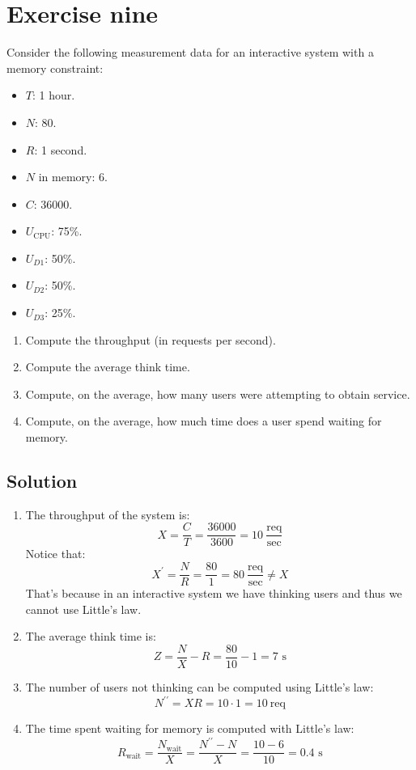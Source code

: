 \section{Exercise nine}

Consider the following measurement data for an interactive system with a memory constraint:
\begin{itemize}
    \item $T$: 1 hour.
    \item $N$: 80.
    \item $R$: 1 second.
    \item $N$ in memory: 6.
    \item $C$: 36000.
    \item $U_{\text{CPU}}$: 75\%.
    \item $U_{D1}$: 50\%.
    \item $U_{D2}$: 50\%.
    \item $U_{D3}$: 25\%.
\end{itemize}
\begin{enumerate}
    \item Compute the throughput (in requests per second).
    \item Compute the average think time.
    \item Compute, on the average, how many users were attempting to obtain service. 
    \item Compute, on the average, how much time does a user spend waiting for memory. 
\end{enumerate}

\subsection*{Solution}
\begin{enumerate}
    \item The throughput of the system is:
        \[X=\dfrac{C}{T}=\dfrac{36000}{3600}=10\:\dfrac{\text{req}}{\text{sec}}\]
        Notice that:
        \[X^\prime=\dfrac{N}{R}=\dfrac{80}{1}=80\:\dfrac{\text{req}}{\text{sec}}\neq X\]
        That's because in an interactive system we have thinking users and thus we cannot use Little's law.
    \item The average think time is:
        \[Z=\dfrac{N}{X}-R=\dfrac{80}{10}-1=7\text{ s}\]
    \item The number of users not thinking can be computed using Little's law:
        \[N^{\prime\prime}=XR=10\cdot 1=10\:\text{req}\]
    \item The time spent waiting for memory is computed with Little's law:
        \[R_{\text{wait}}=\dfrac{N_{\text{wait}}}{X}=\dfrac{N^{\prime\prime}-N}{X}=\dfrac{10-6}{10}=0.4\text{ s}\]
\end{enumerate}